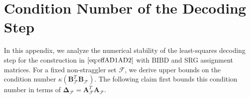 \documentclass[journal,draftcls,onecolumn]{IEEEtran}
\theoremstyle{mystyle}
\newcommand{\bfC}{\mathbf{C}}
\newcommand{\bfH}{\mathbf{H}}
\newcommand{\bfB}{\mathbf{B}}
\newcommand{\bfI}{\mathbf{I}}
\newcommand{\bfP}{\mathbf{P}}
\newcommand{\cF}{\mathcal{F}}
\begin{document}










\section{Condition Number of the Decoding Step}
\label{sec:appendix_cond_number}

In this appendix, we analyze the numerical stability of the least-squares decoding step for the construction in $\eqref{eq:effAD1AD2}$ with BIBD and SRG assignment matrices. For a fixed non-straggler set $\mathcal{F}$, we derive upper bounds on the condition number $\kappa(\mathbf{B}_{\mathcal{F}}^T\mathbf{B}_{\mathcal{F}})$. The following claim first bounds this condition number in terms of $\boldsymbol{\Delta}_{\mathcal{F}}=\mathbf{A}_{\mathcal{F}}^{T}\mathbf{A}_{\mathcal{F}}$.
\end{document}
